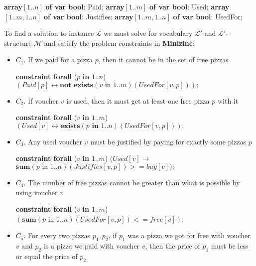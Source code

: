 \documentclass[conference]{IEEEtran}
\newcommand\tab[1][0.3cm]{\hspace*{#1}}
\begin{document}
\begin{algorithmic}
\State \textbf{array}$[1..n]$ \textbf{of var bool}: Paid;
\State \textbf{array}$[1..m]$ \textbf{of var bool}: Used;
\State \textbf{array}$[1..m, 1..n]$ \textbf{of var bool}: Justifies;
\State \textbf{array}$[1..m, 1..n]$ \textbf{of var bool}: UsedFor;
\\
\end{algorithmic}
\tab To find a solution to instance $\mathcal{L}$ we must solve for vocabulary $\mathcal{L'}$ and $\mathcal{L'}$-structure $\mathcal{M}$ and satisfy the problem constraints in \textbf{Minizinc}:
\begin{itemize}
\item $C_1$. If we paid for a pizza $p$, then it cannot be in the set of free pizzas
\begin{algorithmic}
\State \textbf{constraint forall} ($p$ \textbf{in} $1..n$)
\State \tab\tab $(Paid[p]\leftrightarrow
           \textbf{not exists}(v \text{ in } 1..m)(UsedFor[v, p]));$
\\
\end{algorithmic}
\item $C_2$. If voucher $v$ is used, then it must get at least one free pizza $p$ with it
\begin{algorithmic}
\State \textbf{constraint forall} ($v$ \textbf{in} $1..m$)
\State \tab\tab $(Used[v]\leftrightarrow
           \textbf{exists}(p \textbf{ in } 1..n)(UsedFor[v, p]));$
\\
\end{algorithmic}
\item $C_3$. Any used voucher $v$ must be justified by paying for exactly some pizzas $p$
\begin{algorithmic}
\State \textbf{constraint forall} ($v$ \textbf{in} $1..m$)
\State \tab\tab $(Used[v]\rightarrow$
\State \tab\tab\tab $\textbf{sum}(p \text{ in } 1..n)(Justifies[v, p]) >= buy[v]);$
\\
\end{algorithmic}
\item $C_4$. The number of free pizzas cannot be greater than what is possible by using voucher $v$
\begin{algorithmic}
\State \textbf{constraint forall} ($v$ \textbf{in} $1..m$)
\State \tab\tab $(\textbf{sum}(p \text{ in } 1..n)(UsedFor[v, p]) <= free[v])$;
\\
\end{algorithmic}
\item $C_5$. For every two pizzas $p_1, p_2$, if $p_1$ was a pizza we got for free with voucher $v$ and $p_2$ is a pizza we paid with voucher $v$, then the price of $p_1$ must be less or equal the price of $p_2$

\end{itemize}
\end{document}
